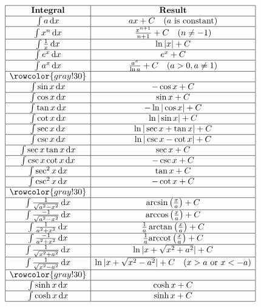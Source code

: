\documentclass[11pt]{../../TexTemplate/elegantbook}
\begin{document}
\[
\begin{array}{|c|c|}
\hline
\textbf{Integral} & \textbf{Result} \\
\hline
\int a \, \mathrm{d}x & ax + C \quad (a \text{ is constant}) \\
\hline
\int x^n \, \mathrm{d}x & \frac{x^{n+1}}{n+1} + C \quad (n \neq -1) \\
\hline
\int \frac{1}{x} \, \mathrm{d}x & \ln|x| + C \\
\hline
\int e^x \, \mathrm{d}x & e^x + C \\
\hline
\int a^x \, \mathrm{d}x & \frac{a^x}{\ln a} + C \quad (a > 0, a \neq 1) \\ \hline
\rowcolor{gray!30} & \\ \hline
\int \sin x \, \mathrm{d}x & -\cos x + C \\ \hline
\int \cos x \, \mathrm{d}x & \sin x + C \\ \hline
\int \tan x \, \mathrm{d}x & -\ln|\cos x| + C \\ \hline
\int \cot x \, \mathrm{d}x & \ln|\sin x| + C \\ \hline
\int \sec x \, \mathrm{d}x & \ln|\sec x + \tan x| + C \\
\hline
\int \csc x \, \mathrm{d}x & \ln|\csc x - \cot x| + C \\
\hline
\int \sec x \tan x \, \mathrm{d}x & \sec x + C \\
\hline
\int \csc x \cot x \, \mathrm{d}x & -\csc x + C \\
\hline
\int \sec^2 x \, \mathrm{d}x & \tan x + C \\
\hline
\int \csc^2 x \, \mathrm{d}x & -\cot x + C \\ \hline
\rowcolor{gray!30} & \\ \hline
\int \frac{1}{\sqrt{a^{2}-x^2}} \, \mathrm{d}x & \arcsin \left( \frac{x}{a} \right) + C \\
\hline
\int \frac{-1}{\sqrt{a^{2}-x^2}} \, \mathrm{d}x & \arccos \left( \frac{x}{a} \right) + C \\
\hline
\int \frac{1}{a^{2}+x^2} \, \mathrm{d}x & \frac{1}{a}\arctan \left( \frac{x}{a} \right) + C \\
\hline
\int \frac{-1}{a^{2}+x^2} \, \mathrm{d}x &\frac{1}{a}\mathrm{arccot } \left( \frac{x}{a} \right) + C \\
\hline
\int \frac{1}{\sqrt{x^2+a^{2}}} \, \mathrm{d}x & \ln|x + \sqrt{x^2+a^{2}}| + C \\
\hline
\int \frac{1}{\sqrt{x^2-a^{2}}} \, \mathrm{d}x & \ln|x + \sqrt{x^2-a^{2}}| + C \quad (x > a \text{ or } x < -a) \\ \hline
\rowcolor{gray!30} & \\ \hline
\int \sinh x \, \mathrm{d}x & \cosh x + C \\
\hline
\int \cosh x \, \mathrm{d}x & \sinh x + C \\
\hline
\end{array}
\]
\end{document}
